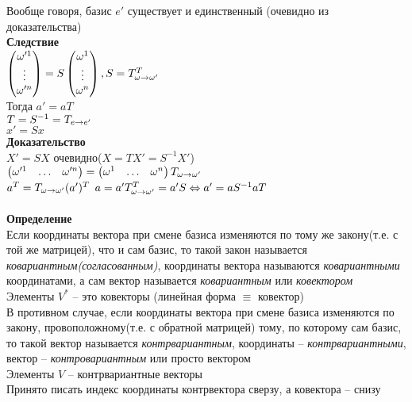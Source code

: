 \documentclass[12pt]{article}
\begin{document}
Вообще говоря, базис $e'$ существует и единственный (очевидно из доказательства)\\
\textbf{Следствие}\\
$\begin{pmatrix}
    \omega'^1\\\vdots\\\omega'^n
\end{pmatrix} = S\begin{pmatrix}
    \omega^1\\\vdots\\\omega^n
\end{pmatrix}, S = T_{\omega \rightarrow \omega'}^T$\\
Тогда $a'=aT$\\
$T = S^{-1} = T_{e\rightarrow e'}$\\
$x'=Sx$\\
\textbf{Доказательство}\\
$X' = SX$ очевидно($X=TX'=S^{-1}X'$)\\
$\begin{pmatrix}
    \omega'^1 & \ldots & \omega'^n
\end{pmatrix} = \begin{pmatrix}
    \omega^1 & \ldots & \omega^n
\end{pmatrix} T_{\omega \rightarrow \omega'}$\\
$a^T = T_{\omega\rightarrow \omega'}(a')^T$
$a=a'T^T_{\omega\rightarrow\omega'} = a'S \Leftrightarrow a'=aS^{-1}aT$\\\\
\textbf{Определение}\\
Если координаты вектора при смене базиса изменяются по тому же закону(т.е. с той же матрицей), что и сам базис, то такой закон называется \textit{ковариантным(согласованным)}, координаты вектора называются \textit{ковариантными} координатами, а сам вектор называется \textit{ковариантным} или \textit{ковектором}\\
Элементы $V^*$ -- это ковекторы (линейная форма $\equiv$ ковектор)\\
В противном случае, если координаты вектора при смене базиса изменяются по закону, провоположному(т.е. с обратной матрицей) тому, по которому сам базис, то такой вектор называется \textit{контрвариантным}, координаты -- \textit{контрвариантными}, вектор -- \textit{контровариантным} или просто вектором\\
Элементы $V$ -- контрвариантные векторы\\
Принято писать индекс координаты контрвектора сверзу, а ковектора -- снизу\\\\
\end{document}
